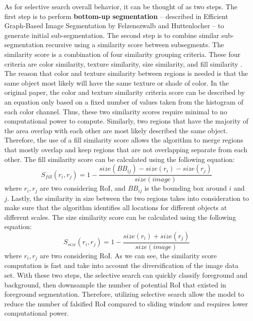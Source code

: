 As for selective search overall behavior, it can be thought of as two steps. The first step is to perform \textbf{bottom-up segmentation} -- described in Efficient Graph-Based Image Segmentation by Felzenszwalb and Huttenlocher \cite{felzenszwalb_huttenlocher_2004} -- to generate initial sub-segmentation. The second step is to combine similar sub-segmentation recursive using a similarity score between subsegments. The similarity score is a combination of four similarity grouping criteria. These four criteria are color similarity, texture similarity, size similarity, and fill similarity \cite{selective_search_2013}. The reason that color and texture similarity between regions is needed is that the same object most likely will have the same texture or shade of color. In the original paper, the color and texture similarity criteria score can be described by an equation only based on a fixed number of values taken from the histogram of each color channel. Thus, these two similarity scores require minimal to no computational power to compute. Similarly, two regions that have the majority of the area overlap with each other are most likely described the same object. Therefore, the use of a fill similarity score allows the algorithm to merge regions that mostly overlap and keep regions that are not overlapping separate from each other. The fill similarity score can be calculated using the following equation: 
%
\begin{equation*}
    S_{fill}(r_i, r_j) = 1-\frac{size(BB_{ij})-size(r_i)-size(r_j)}{size(image)}
\end{equation*}
%
where $r_i, r_j$ are two considering RoI, and $BB_{ij}$ is the bounding box around $i$ and $j$. Lastly, the similarity in size between the two regions takes into consideration to make sure that the algorithm identifies all locations for different objects at different scales. The size similarity score can be calculated using the following equation: 
%
\begin{equation*}
    S_{size}(r_i, r_j) = 1-\frac{size(r_i)+size(r_j)}{size(image)}
\end{equation*}
%
where $r_i, r_j$ are two considering RoI. As we can see, the similarity score computation is fast and take into account the diversification of the image data set. With these two steps, the selective search can quickly classify foreground and background, then downsample the number of potential RoI that existed in foreground segmentation. Therefore, utilizing selective search allow the model to reduce the number of falsified RoI compared to sliding window and requires lower computational power.

